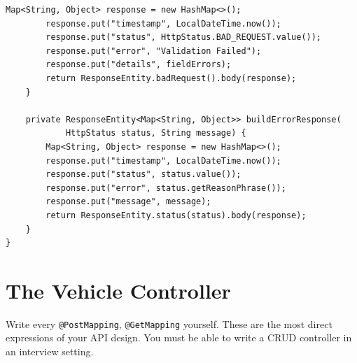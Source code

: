 \documentclass[12pt,a4paper]{report}
\newcommand{\code}[1]{\texttt{\textcolor{keywordblue}{#1}}}
\begin{document}
\begin{lstlisting}[caption=GlobalExceptionHandler.java]
        Map<String, Object> response = new HashMap<>();
        response.put("timestamp", LocalDateTime.now());
        response.put("status", HttpStatus.BAD_REQUEST.value());
        response.put("error", "Validation Failed");
        response.put("details", fieldErrors);
        return ResponseEntity.badRequest().body(response);
    }

    private ResponseEntity<Map<String, Object>> buildErrorResponse(
            HttpStatus status, String message) {
        Map<String, Object> response = new HashMap<>();
        response.put("timestamp", LocalDateTime.now());
        response.put("status", status.value());
        response.put("error", status.getReasonPhrase());
        response.put("message", message);
        return ResponseEntity.status(status).body(response);
    }
}
\end{lstlisting}

\section{The Vehicle Controller}

\begin{tcolorbox}[handbox]
Write every \code{@PostMapping}, \code{@GetMapping} yourself. These are the most direct expressions of your API design. You must be able to write a CRUD controller in an interview setting.
\end{tcolorbox}
\end{document}
